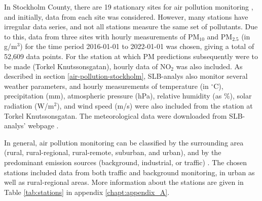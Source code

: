 In Stockholm County, there are 19 stationary sites for air pollution monitoring \cite{slb-matningar}, and initially, data from each site was considered. However, many stations have irregular data series, and not all stations measure the same set of pollutants. Due to this, data from three sites with hourly measurements of PM$_{10}$ and PM$_{2.5}$ (in \textmugreek g/m$^3$) for the time period 2016-01-01 to 2022-01-01 was chosen, giving a total of 52,609 data points. For the station at which PM predictions subsequently were to be made (Torkel Knutssonsgatan), hourly data of NO$_2$ was also included. As described in section \ref{air-pollution-stockholm}, SLB-analys also monitor several weather parameters, and hourly measurements of temperature (in $^\circ$C), precipitation (mm), atmospheric pressure (hPa), relative humidity (as \%), solar radiation (W/m$^2$), and wind speed (m/s) were also included from the station at Torkel Knutssonsgatan. The meteorological data were downloaded from SLB-analys' webpage \cite{slb-analys-meteorologi}. 

In general, air pollution monitoring can be classified by the surrounding area (rural, rural-regional, rural-remote, suburban, and urban), and by the predominant emission sources (background, industrial, or traffic) \cite{smhi-luftmatningar}. The chosen stations included data from both traffic and background monitoring, in urban as well as rural-regional areas. More information about the stations are given in Table \ref{tab:stations} in appendix \ref{chapt:appendix_A}. 


